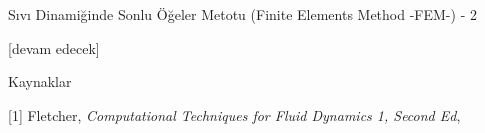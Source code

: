 \documentclass[12pt,fleqn]{article}\usepackage{../../common}
\begin{document}
Sıvı Dinamiğinde Sonlu Öğeler Metotu (Finite Elements Method -FEM-) - 2







[devam edecek]

Kaynaklar

[1] Fletcher, {\em Computational Techniques for Fluid Dynamics 1, Second Ed}, 
\end{document}
